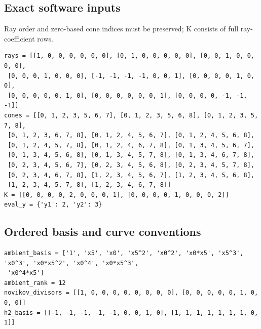 \documentclass[10pt,a4paper]{article}
\begin{document}
\subsection*{Exact software inputs}
Ray order and zero-based cone indices must be preserved; K consists of full ray-coefficient rows.
\begin{lstlisting}
rays = [[1, 0, 0, 0, 0, 0, 0], [0, 1, 0, 0, 0, 0, 0], [0, 0, 1, 0, 0, 0, 0],
 [0, 0, 0, 1, 0, 0, 0], [-1, -1, -1, -1, 0, 0, 1], [0, 0, 0, 0, 1, 0, 0],
 [0, 0, 0, 0, 0, 1, 0], [0, 0, 0, 0, 0, 0, 1], [0, 0, 0, 0, -1, -1, -1]]
cones = [[0, 1, 2, 3, 5, 6, 7], [0, 1, 2, 3, 5, 6, 8], [0, 1, 2, 3, 5, 7, 8],
 [0, 1, 2, 3, 6, 7, 8], [0, 1, 2, 4, 5, 6, 7], [0, 1, 2, 4, 5, 6, 8],
 [0, 1, 2, 4, 5, 7, 8], [0, 1, 2, 4, 6, 7, 8], [0, 1, 3, 4, 5, 6, 7],
 [0, 1, 3, 4, 5, 6, 8], [0, 1, 3, 4, 5, 7, 8], [0, 1, 3, 4, 6, 7, 8],
 [0, 2, 3, 4, 5, 6, 7], [0, 2, 3, 4, 5, 6, 8], [0, 2, 3, 4, 5, 7, 8],
 [0, 2, 3, 4, 6, 7, 8], [1, 2, 3, 4, 5, 6, 7], [1, 2, 3, 4, 5, 6, 8],
 [1, 2, 3, 4, 5, 7, 8], [1, 2, 3, 4, 6, 7, 8]]
K = [[0, 0, 0, 0, 2, 0, 0, 0, 1], [0, 0, 0, 0, 1, 0, 0, 0, 2]]
eval_y = {'y1': 2, 'y2': 3}
\end{lstlisting}
\subsection*{Ordered basis and curve conventions}
\begin{lstlisting}
ambient_basis = ['1', 'x5', 'x0', 'x5^2', 'x0^2', 'x0*x5', 'x5^3', 'x0^3', 'x0*x5^2', 'x0^4', 'x0*x5^3',
 'x0^4*x5']
ambient_rank = 12
novikov_divisors = [[1, 0, 0, 0, 0, 0, 0, 0, 0], [0, 0, 0, 0, 0, 1, 0, 0, 0]]
h2_basis = [[-1, -1, -1, -1, -1, 0, 0, 1, 0], [1, 1, 1, 1, 1, 1, 1, 0, 1]]
\end{lstlisting}
\end{document}
